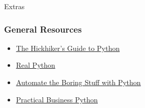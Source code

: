 \documentclass[handout, 11pt]{beamer}
\begin{document}
\begin{section}{Extras}
\begin{frame}
\frametitle{General Resources}
\begin{itemize}
\item \textcolor{blue}{\underline{\href{https://docs.python-guide.org/}{The Hickhiker's Guide to Python}}}
\vfill
\item \textcolor{blue}{\underline{\href{https://realpython.com/}{Real Python}}}
\vfill
\item \textcolor{blue}{\underline{\href{https://automatetheboringstuff.com/}{Automate the Boring Stuff with Python}}}
\vfill
\item \textcolor{blue}{\underline{\href{https://pbpython.com/}{Practical Business Python}}}
\end{itemize}
\end{frame}
\end{section}
\end{document}
